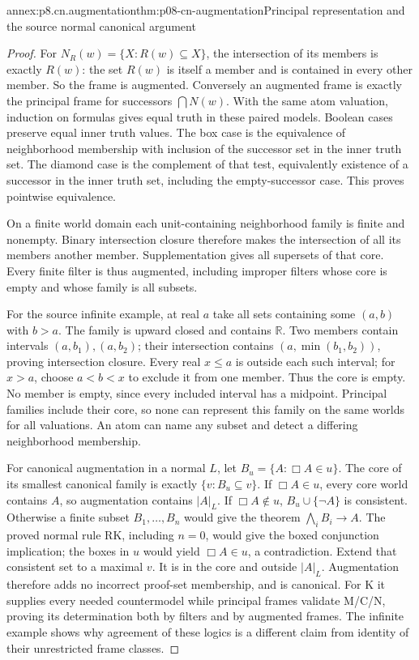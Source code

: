 \begin{annexitem}{annex:p8.cn.augmentation}{thm:p08-cn-augmentation}{Principal representation and the source normal canonical argument}
\begin{proof}
For \(N_R(w)=\{X:R(w)\subseteq X\}\), the intersection
of its members is exactly \(R(w)\): the set \(R(w)\)
is itself a member and is contained in every other member.
So the frame is augmented. Conversely an augmented frame is
exactly the principal frame for successors \(\bigcap N(w)\).
With the same atom valuation, induction on formulas gives equal
truth in these paired models. Boolean cases preserve equal
inner truth values. The box case is the equivalence of neighborhood
membership with inclusion of the successor set in the inner truth
set. The diamond case is the complement of that test, equivalently
existence of a successor in the inner truth set, including the
empty-successor case. This proves pointwise equivalence.

On a finite world domain each unit-containing neighborhood family
is finite and nonempty. Binary intersection closure therefore
makes the intersection of all its members another member.
Supplementation gives all supersets of that core. Every finite
filter is thus augmented, including improper filters whose core
is empty and whose family is all subsets.

For the source infinite example, at real \(a\) take all sets
containing some \((a,b)\) with \(b>a\). The family is upward
closed and contains \(\mathbb R\). Two members contain intervals
\((a,b_1),(a,b_2)\); their intersection contains
\((a,\min(b_1,b_2))\), proving intersection closure.
Every real \(x\leq a\) is outside each such interval; for
\(x>a\), choose \(a<b<x\) to exclude it from one member.
Thus the core is empty. No member is empty, since every included
interval has a midpoint. Principal families include their core,
so none can represent this family on the same worlds for all
valuations. An atom can name any subset and detect a differing
neighborhood membership.

For canonical augmentation in a normal \(L\), let
\(B_u=\{A:\Box A\in u\}\). The core of its smallest
canonical family is exactly \(\{v:B_u\subseteq v\}\).
If \(\Box A\in u\), every core world contains \(A\),
so augmentation contains \(|A|_L\). If \(\Box A\notin u\),
\(B_u\cup\{\neg A\}\) is consistent. Otherwise a finite
subset \(B_1,\ldots,B_n\) would give the theorem
\(\bigwedge_iB_i\to A\). The proved normal rule RK,
including \(n=0\), would give the boxed conjunction implication;
the boxes in \(u\) would yield \(\Box A\in u\), a contradiction.
Extend that consistent set to a maximal \(v\). It is in the core
and outside \(|A|_L\). Augmentation therefore adds no incorrect
proof-set membership, and is canonical. For K it supplies every
needed countermodel while principal frames validate M/C/N, proving
its determination both by filters and by augmented frames. The
infinite example shows why agreement of these logics is a different
claim from identity of their unrestricted frame classes.
\end{proof}
\end{annexitem}

